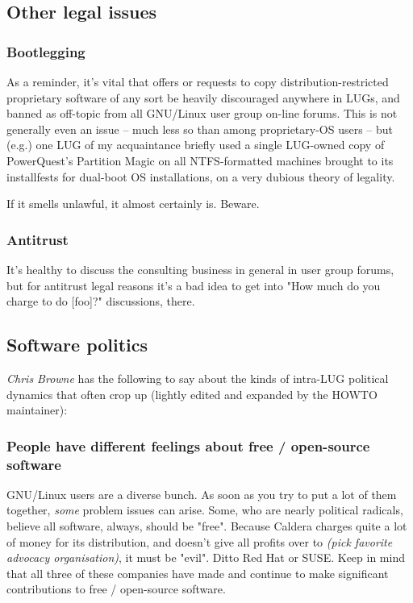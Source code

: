 \documentclass{HOWTO}
\begin{document}
\subsection{Other legal issues}






\subsubsection{Bootlegging}

As a reminder, it's vital that offers or requests to copy
distribution-restricted proprietary software of any sort be heavily
discouraged anywhere in LUGs, and banned as off-topic from all GNU/Linux user
group on-line forums.  This is not generally even an issue -- much less
so than among proprietary-OS users -- but (e.g.) one LUG of my
acquaintance briefly used a single LUG-owned copy of PowerQuest's
Partition Magic on all NTFS-formatted machines brought to its
installfests for dual-boot OS installations, on a very dubious theory
of legality.

If it smells unlawful, it almost certainly is.  Beware.




\subsubsection{Antitrust}

It's healthy to discuss the consulting business in general in user
group forums, but for antitrust legal reasons it's a bad idea to get into 
"How much do you charge to do {[}foo]?" discussions, there.




\subsection{Software politics}


\emph{Chris Browne} \texttt{\aesurl}
 has the
following to say about the kinds of intra-LUG political dynamics that
often crop up (lightly edited and expanded by the HOWTO maintainer):




\subsubsection{People have different feelings about free / open-source software}

GNU/Linux users are a diverse bunch.  As soon as you try to put a lot of
them together, {\itshape some\/} problem issues can arise. Some, who are
nearly political radicals, believe all software, always, should be
"free".  Because Caldera charges quite a lot of money for its
distribution, and doesn't give all profits over to {\itshape (pick favorite
advocacy organisation)\/}, it must be "evil".  Ditto Red Hat or
SUSE.  Keep in mind that all three of these companies have made and
continue to make significant contributions to free / open-source software.
\end{document}
